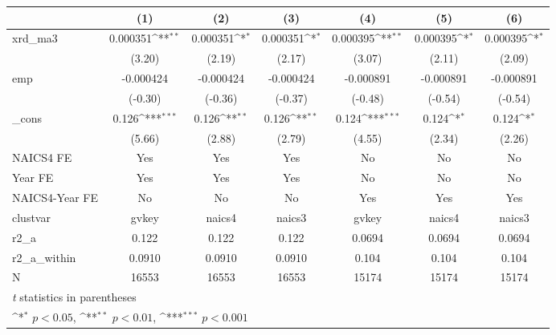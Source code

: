 {
\def\sym#1{\ifmmode^{#1}\else\(^{#1}\)\fi}
\begin{tabular}{l*{6}{c}}
\hline\hline
            &\multicolumn{1}{c}{(1)}         &\multicolumn{1}{c}{(2)}         &\multicolumn{1}{c}{(3)}         &\multicolumn{1}{c}{(4)}         &\multicolumn{1}{c}{(5)}         &\multicolumn{1}{c}{(6)}         \\
\hline
xrd\_ma3     &    0.000351\sym{**} &    0.000351\sym{*}  &    0.000351\sym{*}  &    0.000395\sym{**} &    0.000395\sym{*}  &    0.000395\sym{*}  \\
            &      (3.20)         &      (2.19)         &      (2.17)         &      (3.07)         &      (2.11)         &      (2.09)         \\
[1em]
emp         &   -0.000424         &   -0.000424         &   -0.000424         &   -0.000891         &   -0.000891         &   -0.000891         \\
            &     (-0.30)         &     (-0.36)         &     (-0.37)         &     (-0.48)         &     (-0.54)         &     (-0.54)         \\
[1em]
\_cons      &       0.126\sym{***}&       0.126\sym{**} &       0.126\sym{**} &       0.124\sym{***}&       0.124\sym{*}  &       0.124\sym{*}  \\
            &      (5.66)         &      (2.88)         &      (2.79)         &      (4.55)         &      (2.34)         &      (2.26)         \\
[1em]
NAICS4 FE   &         Yes         &         Yes         &         Yes         &          No         &          No         &          No         \\
[1em]
Year FE     &         Yes         &         Yes         &         Yes         &          No         &          No         &          No         \\
[1em]
NAICS4-Year FE&          No         &          No         &          No         &         Yes         &         Yes         &         Yes         \\
\hline
clustvar    &       gvkey         &      naics4         &      naics3         &       gvkey         &      naics4         &      naics3         \\
r2\_a        &       0.122         &       0.122         &       0.122         &      0.0694         &      0.0694         &      0.0694         \\
r2\_a\_within &      0.0910         &      0.0910         &      0.0910         &       0.104         &       0.104         &       0.104         \\
N           &       16553         &       16553         &       16553         &       15174         &       15174         &       15174         \\
\hline\hline
\multicolumn{7}{l}{\footnotesize \textit{t} statistics in parentheses}\\
\multicolumn{7}{l}{\footnotesize \sym{*} \(p<0.05\), \sym{**} \(p<0.01\), \sym{***} \(p<0.001\)}\\
\end{tabular}
}
